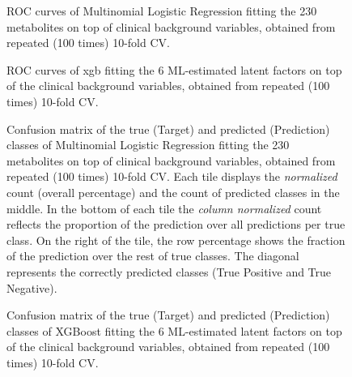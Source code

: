 \documentclass{amsart}
\begin{document}
\begin{figure}[h]
  
  \caption{\label{roc:full}ROC curves of Multinomial Logistic Regression fitting the 230 metabolites on top of clinical background variables, obtained from repeated (100 times) 10-fold CV. }
\end{figure} \clearpage
\begin{figure}[h]
  
  \caption{\label{roc:xgb} ROC curves of \acrlong{xgb} fitting the 6 ML-estimated latent factors on top of the clinical background variables, obtained from repeated (100 times) 10-fold CV. }
  \end{figure} 
\begin{figure}[h]
  
  \caption{Confusion matrix of the true (Target) and predicted (Prediction) classes of Multinomial Logistic Regression fitting the 230 metabolites on top of clinical background variables, obtained from repeated (100 times) 10-fold CV. Each tile displays the \textit{normalized} count (overall percentage) and the count of predicted classes in the middle. In the bottom of each tile the \textit{column normalized} count reflects the proportion of the prediction over all predictions per true class. On the right of the tile, the row percentage shows the fraction of the prediction over the rest of true classes. The diagonal represents the correctly predicted classes (True Positive and True Negative).}
  \label{cm:full}
\end{figure} \clearpage
\begin{figure}[ht]
    
    \caption{Confusion matrix of the true (Target) and predicted (Prediction) classes of XGBoost fitting the 6 ML-estimated latent factors on top of the clinical background variables, obtained from repeated (100 times) 10-fold CV.}
  \label{cm:xgboost}
\end{figure}
\end{document}
